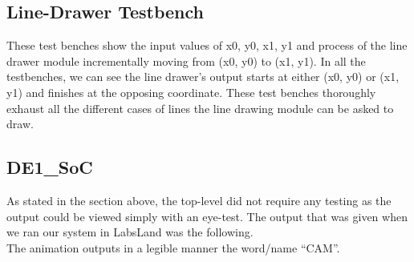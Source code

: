 \documentclass[11pt, titlepage]{article}
\begin{document}
        \subsection{Line-Drawer Testbench}
            
            
            These test benches show the input values of x0, y0, x1, y1 and process of the line drawer module incrementally moving from (x0, y0) to (x1, y1). In all the testbenches, we can see the line drawer's output starts at either (x0, y0) or (x1, y1) and finishes at the opposing coordinate. These test benches thoroughly exhaust all the different cases of lines the line drawing module can be asked to draw. 

        \subsection{DE1\_SoC}
            As stated in the section above, the top-level did not require any testing as the output could be viewed simply with an eye-test. The output that was given when we ran our system in LabsLand was the following. \\
            
            The animation outputs in a legible manner the word/name “CAM”.
        \newpage
\end{document}
